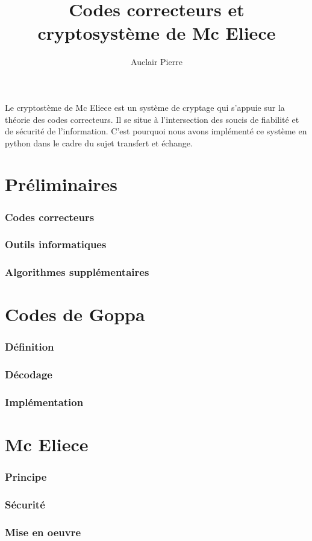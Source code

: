 \documentclass{article}
\title{Codes correcteurs et cryptosystème de Mc Eliece}
\author{Auclair Pierre}
\begin{document}
	\maketitle

	Le cryptostème de Mc Eliece est un système de cryptage qui s'appuie sur la théorie des codes correcteurs.
	Il se situe à l'intersection des soucis de fiabilité et de sécurité de l'information.
	C'est pourquoi nous avons implémenté ce système en python dans le cadre du sujet transfert et échange.


	\part*{Préliminaires}

		\section*{Codes correcteurs}



		\section*{Outils informatiques}

		\section*{Algorithmes supplémentaires}

	\part*{Codes de Goppa}

		\section*{Définition}

		\section*{Décodage}

		\section*{Implémentation}


	\part*{Mc Eliece}

		\section*{Principe}

		\section*{Sécurité}

		\section*{Mise en oeuvre}








\end{document}
